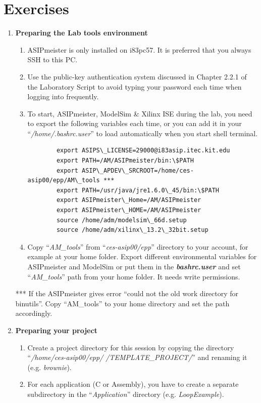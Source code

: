 \section*{Exercises}
\begin{enumerate}
\item \textbf{Preparing the Lab tools environment}
	\begin{enumerate}
	\item ASIPmeister is only installed on i83pc57. It is preferred that you always SSH to this PC.
	\item Use the public-key authentication system discussed in Chapter 2.2.1 of the Laboratory Script to avoid typing your password each time when logging into frequently.
	\item To start, ASIPmeister, ModelSim \& Xilinx ISE during the lab, you need to export the following variables each time, or you can add it in your ``\emph{/home/.bashrc.user}'' to load automatically when you start shell terminal.
	\begin{lstlisting}
		export ASIPS\_LICENSE=29000@i83asip.itec.kit.edu
		export PATH=/AM/ASIPmeister/bin:\$PATH
		export ASIP\_APDEV\_SRCROOT=/home/ces-asip00/epp/AM\_tools ***
		export PATH=/usr/java/jre1.6.0\_45/bin:\$PATH
		export ASIPmeister\_Home=/AM/ASIPmeister
		export ASIPmeister\_HOME=/AM/ASIPmeister
		source /home/adm/modelsim\_66d.setup
		source /home/adm/xilinx\_13.2\_32bit.setup
	\end{lstlisting}
	\item Copy ``\emph{AM\_tools}'' from ``\emph{ces-asip00/epp}'' directory to your account, for example at your home folder. Export different environmental variables for ASIPmeister and ModelSim or put them in the \emph{\textbf{bashrc.user}} and set ``\emph{AM\_tools}'' path from your home folder. It needs write permissions.
	\end{enumerate}
*** If the ASIPmeister gives error ``could not the old work directory for binutils''. Copy ``AM\_tools'' to your home directory and set the path accordingly.
\item \textbf{Preparing your project}
	\begin{enumerate}
	\item Create a project directory for this session by copying the directory ``\emph{/home/ces-asip00/­epp/ /TEMPLATE\_PROJECT/}'' and renaming it (e.g. \emph{brownie}).
	\item For each application (C or Assembly), you have to create a separate subdirectory in the ``\emph{Application}'' directory (e.g. \emph{LoopExample}).

\end{enumerate}
\end{enumerate}
